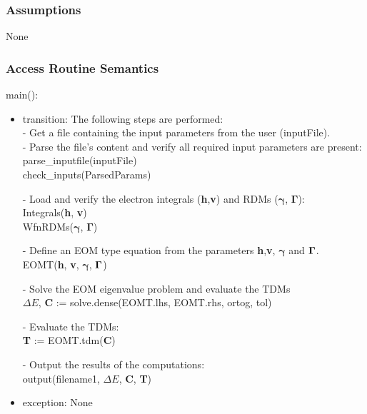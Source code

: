 \documentclass[12pt, titlepage]{article}
\begin{document}
\subsubsection{Assumptions}

None

\subsubsection{Access Routine Semantics}

\noindent main():
\begin{itemize}
\item transition: The following steps are performed:\\
- Get a file containing the input parameters from the user (inputFile).\\

- Parse the file's content and verify all required input parameters are 
present:\\
parse\_inputfile(inputFile)\\
check\_inputs(ParsedParams)

- Load and verify the electron integrals (\textbf{h},\textbf{v}) and 
RDMs ($\boldsymbol{\gamma}$, $\boldsymbol{\Gamma}$):\\
Integrals(\textbf{h}, \textbf{v})\\
WfnRDMs($\boldsymbol{\gamma}$, $\boldsymbol{\Gamma}$)

- Define an EOM type equation from the parameters \textbf{h},\textbf{v}, 
$\boldsymbol{\gamma}$ and $\bold{\Gamma}$.\\
EOMT(\textbf{h}, \textbf{v}, $\boldsymbol{\gamma}$, $\bold{\Gamma}$)

- Solve the EOM eigenvalue problem and evaluate the TDMs\\
$\Delta E$, \textbf{C} := solve.dense(EOMT.lhs, EOMT.rhs, ortog, tol)

- Evaluate the TDMs:\\
\textbf{T} := EOMT.tdm(\textbf{C})

- Output the results of the computations:\\
output(filename1, $\Delta E$, \textbf{C}, \textbf{T})\\
\item exception: None
\end{itemize}
\end{document}
